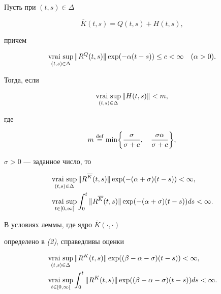 \begin{lemnonum} Пусть при $(t,s)\in\Delta$


\begin{equation}


\overline K(t,s)=Q(t,s)+H(t,s),


\end{equation}


причем


\begin{equation}


\vraisup\limits_{(t,s)\in\Delta}\|R^Q(t,s)\|


\exp(-\alpha(t-s))\le c<\infty\quad (\alpha>0).


\end{equation}





Тогда, если


$$


\vraisup\limits_{(t,s)\in\Delta}\|H(t,s)\|<m,


$$


где


\begin{equation}


m\df\min\biggl\{\frac{\sigma}{\sigma+c},\quad \frac{\sigma\alpha}{\sigma+c}


\biggr\},


\end{equation}


$\sigma>0$ --- заданное число, то


\begin{align*}


&\vraisup\limits_{(t,s)\in\Delta}\|R^{\overline K}(t,s)\|


\exp(-(\alpha+\sigma)(t-s))<\infty, \\


&\vraisup\limits_{t\in[0,\infty[}\int_0^t\|R^{\overline K}(t,s)\|


\exp(-(\alpha+\sigma)(t-s))ds<\infty.


\end{align*}


\end{lemnonum}





\begin{thm} В условиях леммы, где ядро $\overline K(\cdot,\cdot)$


определено в {\em (2)}, справедливы оценки


\begin{align}


&\vraisup\limits_{(t,s)\in\Delta}\|R^K(t,s)\|


\exp((\beta-\alpha-\sigma)(t-s))<\infty, \\


&\vraisup\limits_{t\in[0,\infty[}\int_0^t\|R^K(t,s)\|


\exp((\beta-\alpha-\sigma)(t-s))ds<\infty.


\end{align}


\end{thm}





